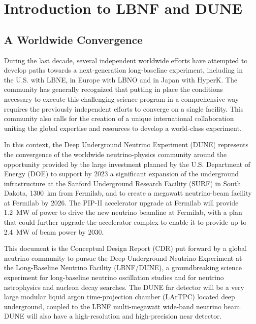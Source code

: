 

\chapter{Introduction to LBNF and DUNE}
\label{ch:project-overview}

%
%
\section{A Worldwide Convergence}

During the last decade, several independent worldwide efforts have attempted to develop paths towards a next-generation long-baseline experiment, including in the U.S. with LBNE, in Europe with LBNO and in Japan with HyperK.  The community has %
generally recognized that putting in place %
the conditions necessary to 
execute this challenging science program in a comprehensive way requires the previously independent 
efforts to converge on a single facility. This community %
also calls for the creation of a unique international collaboration uniting %
the global expertise and resources to develop a world-class experiment.

In this context, the Deep Underground Neutrino Experiment (DUNE) represents the convergence of the worldwide neutrino-physics community around the opportunity provided by the large investment planned by the U.S. Department of Energy (DOE) to support by 2023 a significant expansion of the underground infrastructure at the Sanford Underground Research Facility (SURF) in South Dakota, \SI{1300}{\km} from Fermilab, and to create a megawatt neutrino-beam facility at Fermilab by 2026.  The PIP-II accelerator upgrade at Fermilab will provide \SI{1.2}{\MW} of power to drive the new neutrino beamline at Fermilab, with a plan that could further upgrade the 
accelerator complex to enable it to provide up to \SI{2.4}{\MW} of beam power by 2030.  

This document is %
the Conceptual Design Report (CDR) put forward by a global neutrino community to pursue 
the Deep Underground Neutrino Experiment at the Long-Baseline Neutrino Facility (LBNF/DUNE),
a groundbreaking science experiment for long-baseline neutrino oscillation studies and for neutrino astrophysics and nucleon decay searches. The DUNE far detector will be a very large modular liquid argon time-projection chamber (LArTPC) located deep underground, coupled to the LBNF multi-megawatt  %
wide-band neutrino beam.   DUNE will also have a high-resolution and high-precision near detector.


